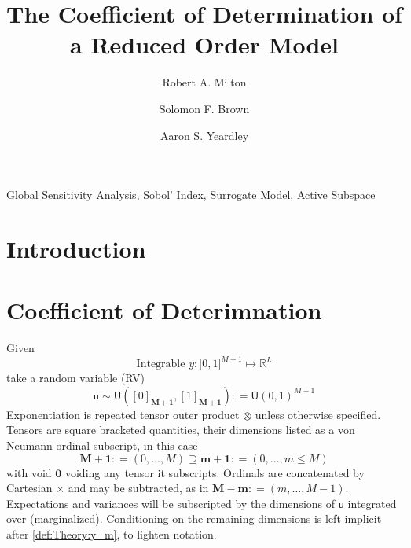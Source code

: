 \documentclass[preprint,12pt]{elsarticle}
\newcommand*{\M}[1]{\ensuremath{#1}\xspace}
\newcommand*{\mi}[1]{\mathbf{#1}}
\newcommand*{\st}[1]{\mathbb{#1}}
\newcommand*{\rv}[1]{\mathsf{#1}}
\newcommand*{\te}[2][]{\left\lbrack{#2}\right\rbrack_{#1}}
\newcommand*{\deq}{\M{\mathrel{\mathop:}=}}
\newcommand{\T}[1]{\text{#1}}
\newcommand*{\uni}[2]{\mathsf{U}\!\left({#1,#2}\right)}
\newcommand*{\uniti}{\lbrack 0,1\rbrack}
\begin{document}
\begin{frontmatter}

    \title{The Coefficient of Determination of a Reduced Order Model}

    \author{Robert A. Milton}

    \author{Solomon F. Brown}

    \author{Aaron S. Yeardley}

    \address{Department of Chemical and Biological Engineering, University of Sheffield, Sheffield, S1 3JD, United Kingdom}       

    \begin{abstract}
    \end{abstract}

    \begin{keyword}
        Global Sensitivity Analysis, Sobol' Index, Surrogate Model, Active Subspace
    \end{keyword}

\end{frontmatter}


\section{Introduction}\label{sec:Intro}


\section{Coefficient of Deterimnation}\label{sec:COD}
    Given
    \begin{equation*}
        \T{Integrable } y \colon \uniti^{M+1} \mapsto \st{R}^{L}
    \end{equation*}
    take a random variable (RV)
    \begin{equation*}
        \rv{u} \sim \uni{\te[\mi{M+1}]{0}}{\te[\mi{M+1}]{1}} \deq \uni{0}{1}^{M+1}
    \end{equation*}
    Exponentiation is repeated tensor outer product $\otimes$ unless otherwise specified. Tensors are square bracketed quantities, their dimensions listed as a von Neumann ordinal subscript, in this case
    \begin{equation*}
        \mi{M+1} \deq (0,\ldots,M) \supseteq \mi{m+1} \deq (0,\ldots,m \leq M)
    \end{equation*}
    with void $\mi{0}$ voiding any tensor it subscripts. Ordinals are concatenated by Cartesian $\times$ and may be subtracted, as in $\mi{M-m} \deq (m,\ldots,M-1)$.
    Expectations and variances will be subscripted by the dimensions of $\rv{u}$ integrated over (marginalized). Conditioning on the remaining dimensions is left implicit after \cref{def:Theory:y_m}, to lighten notation.
\end{document}
